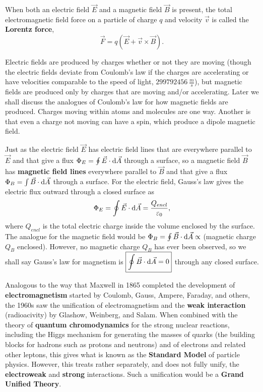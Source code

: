When both an electric field $\vec{E}$ and a magnetic field $\vec{B}$ is present, the total electromagnetic field force on a particle of charge $q$ and velocity $\vec{v}$ is called the \textbf{Lorentz force},
\begin{equation}
\boxed{\vec{F} = q(\vec{E} + \vec{v} \times \vec{B})}.
\end{equation}

Electric fields are produced by charges whether or not they are moving (though the electric fields deviate from Coulomb's law if the charges are accelerating or have velocities comparable to the speed of light, $\SI{299792456}{\frac{m}{s}}$), but magnetic fields are produced only by charges that are moving and/or accelerating. Later we shall discuss the analogues of Coulomb's law for how magnetic fields are produced. Charges moving within atoms and molecules are one way. Another is that even a charge not moving can have a spin, which produce a dipole magnetic field.

Just as the electric field $\vec{E}$ has electric field lines that are everywhere parallel to $\vec{E}$ and that give a flux $\Phi_E = \oint \vec{E} \cdot \operatorname{d\!} \vec{A}$ through a surface, so a magnetic field $\vec{B}$ has \textbf{magnetic field lines} everywhere parallel to $\vec{B}$ and that give a flux $\Phi_B = \int \vec{B} \cdot \operatorname{d\!} \vec{A}$ through a surface. For the electric field, Gauss's law gives the electric flux outward through a closed surface as 
\begin{equation}
\Phi_E = \oint \vec{E} \cdot \operatorname{d\!} \vec{A} = \frac{Q_{encl}}{\varepsilon_0},
\end{equation}
where $Q_{encl}$ is the total electric charge inside the volume enclosed by the surface. The analogue for the magnetic field would be $\Phi_B = \oint \vec{B} \cdot \operatorname{d\!} \vec{A} \propto$ (magnetic charge $Q_B$ enclosed). However, no magnetic charge $Q_B$ has ever been observed, so we shall say Gauss's law for magnetism is $\boxed{\oint \vec{B} \cdot \operatorname{d\!} \vec{A} = 0}$ through any closed surface.

Analogous to the way that Maxwell in 1865 completed the development of \textbf{electromagnetism} started by Coulomb, Gauss, Ampere, Faraday, and others, the 1960s saw the unification of electromagnetism and the \textbf{weak interaction} (radioacivity) by Glashow, Weinberg, and Salam. When combined with the theory of \textbf{quantum chromodynamics} for the strong nuclear reactions, including the Higgs mechanism for generating the masses of quarks (the building blocks for hadrons such as protons and neutrons) and of electrons and related other leptons, this gives what is known as the \textbf{Standard Model} of particle physics. However, this treats rather separately, and does not fully unify, the \textbf{electroweak} and \textbf{strong} interactions. Such a unification would be a \textbf{Grand Unified Theory}.

